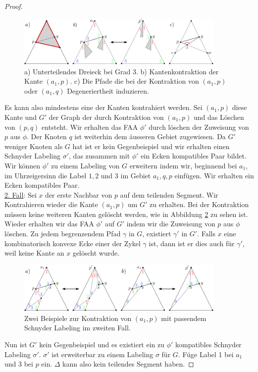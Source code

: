 \begin{proof}
\begin{figure}[h]
	\centering
	  \includegraphics[width=0.9\textwidth]{lem3_1.png}
    	\caption{a) Unterteilendes Dreieck bei Grad 3. b) Kantenkontraktion der Kante $(a_1,p)$. c) Die Pfade die bei der Kontraktion von $(a_1,p)$ oder $(a_1,q)$ Degeneriertheit induzieren.}
    	\label{ccc1}
\end{figure}

Es kann also mindestens eine der Kanten kontrahiert werden. Sei $(a_1,p)$ diese Kante und $G'$ der Graph der durch Kontraktion von $(a_1,p)$ und das Löschen von $(p,q)$ entsteht. Wir erhalten das FAA $\phi'$ durch löschen der Zuweisung von $p$ aus $\phi$. Der Knoten $q$ ist weiterhin dem äusseren Gebiet zugewiesen. Da $G'$ weniger Knoten als $G$ hat ist er kein Gegenbeispiel und wir erhalten einen Schnyder Labeling $\sigma'$, das zusammen mit $\phi'$ ein Ecken kompatibles Paar bildet. Wir können $\phi'$ zu einem Labeling von $G$ erweitern indem wir, beginnend bei $a_1$, im Uhrzeigersinn die Label $1,2$ und $3$ im Gebiet $a_1,q,p$ einfügen. Wir erhalten ein Ecken kompatibles Paar. \\

\underline{2. Fall}: Sei $x$ der erste Nachbar von $p$ auf dem teilenden Segment. Wir Kontrahieren wieder die Kante $(a_1,p)$ um $G'$ zu erhalten. Bei der Kontraktion müssen keine weiteren Kanten gelöscht werden, wie in Abbildung \ref{pic_lem3_2} zu sehen ist. Wieder erhalten wir das FAA $\phi'$ auf $G'$ indem wir die Zuweisung von $p$ aus $\phi$ löschen. Zu jedem begrenzendem Pfad $\gamma$ in $G$, existiert $\gamma'$ in $G'$. Falls $x$ eine kombinatorisch konvexe Ecke einer der Zykel $\gamma$ ist, dann ist er dies auch für $\gamma'$, weil keine Kante an $x$ gelöscht wurde.

\begin{figure}[h]
	\centering
	  \includegraphics[width=0.9\textwidth]{lem3_2.png}
    	\caption{Zwei Beispiele zur Kontraktion von $(a_1,p)$ mit passendem Schnyder Labeling im zweiten Fall.}
    	\label{pic_lem3_2}
\end{figure}

Nun ist $G'$ kein Gegenbeispiel und es existiert ein zu $\phi'$ kompatibles Schnyder Labeling $\sigma'$. $\sigma'$ ist erweiterbar zu einem Labeling $\sigma$ für $G$. Füge Label 1 bei $a_1$ und 3 bei $p$ ein. $\Delta$ kann also kein teilendes Segment haben.

\end{proof}


